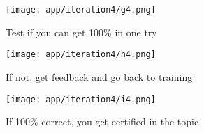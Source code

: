 \begin{figure}[h]
    \centering
    \texttt{[image: app/iteration4/g4.png]}
    \caption{Test if you can get 100\% in one try}
    \label{fig:g4}
\end{figure}

\begin{figure}[h]
    \centering
    \texttt{[image: app/iteration4/h4.png]}
    \caption{If not, get feedback and go back to training}
    \label{fig:h4}
\end{figure}

\begin{figure}[h]
    \centering
    \texttt{[image: app/iteration4/i4.png]}
    \caption{If 100\% correct, you get certified in the topic}
    \label{fig:i4}
\end{figure}
